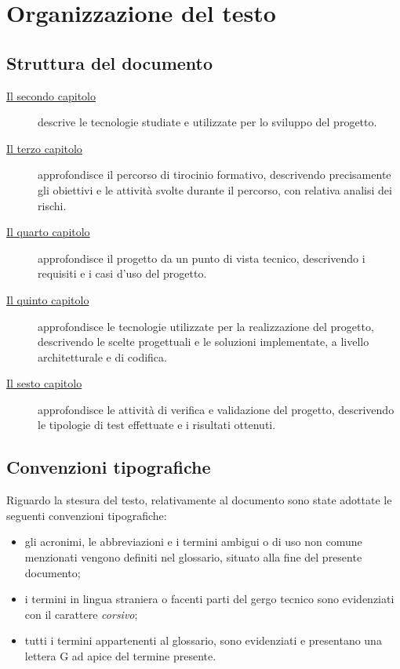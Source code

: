 \section{Organizzazione del testo}

\subsection{Struttura del documento}

\begin{description}
    \item[{\hyperref[cap:tecnologie]{Il secondo capitolo}}] descrive le tecnologie studiate e utilizzate per lo sviluppo del progetto.
    
    \item[{\hyperref[cap:descrizione-stage]{Il terzo capitolo}}] approfondisce il percorso di tirocinio formativo, descrivendo precisamente gli obiettivi e le attività svolte durante il percorso,
    con relativa analisi dei rischi.
    
    \item[{\hyperref[cap:analisi-requisiti]{Il quarto capitolo}}] approfondisce il progetto da un punto di vista tecnico, descrivendo i requisiti e i casi d'uso del progetto.
    
    \item[{\hyperref[cap:progettazione-codifica]{Il quinto capitolo}}] approfondisce le tecnologie utilizzate per la realizzazione del progetto, descrivendo le scelte progettuali e le soluzioni implementate,
    a livello architetturale e di codifica.
    
    \item[{\hyperref[cap:verifica-validazione]{Il sesto capitolo}}] approfondisce le attività di verifica e validazione del progetto, descrivendo le tipologie di test effettuate e i risultati ottenuti.
\end{description}

\subsection{Convenzioni tipografiche}
Riguardo la stesura del testo, relativamente al documento sono state adottate le seguenti convenzioni tipografiche:
\begin{itemize}
	\item gli acronimi, le abbreviazioni e i termini ambigui o di uso non comune menzionati vengono definiti nel glossario, situato alla fine del presente documento;
	\item i termini in lingua straniera o facenti parti del gergo tecnico sono evidenziati con il carattere \emph{corsivo};
	\item tutti i termini appartenenti al glossario, sono evidenziati e presentano una lettera G ad apice del termine presente.
\end{itemize}

